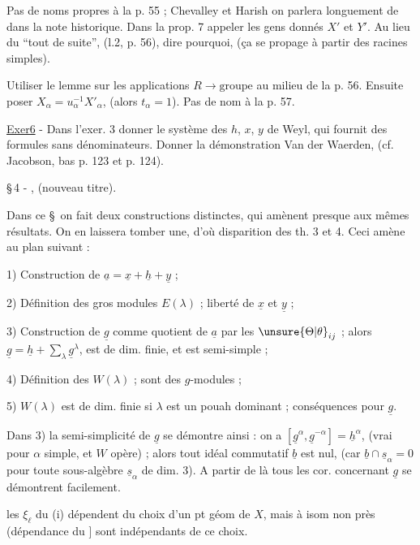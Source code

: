 Pas de noms propres à la p. 55 ; Chevalley et Harish on parlera longuement de dans la note historique. Dans la prop. 7 appeler les gens donnés $X'$ et $Y'$. Au lieu du ``tout de suite'', (l.2, p. 56), dire pourquoi, (ça se propage à partir des racines simples).

Utiliser le lemme sur les applications $R\longrightarrow\text{groupe}$ au milieu de la p. 56. Ensuite poser $X_\alpha=u_\alpha^{-1}X'_\alpha$, (alors $t_\alpha=1$). Pas de nom à la p. 57.

\uline{Exer6} - Dans l'exer. 3 donner le système des $h$, $x$, $y$ de Weyl, qui fournit des formules sans dénominateurs. Donner la démonstration Van der Waerden, (cf. Jacobson, bas p. 123 et p. 124).

\S\,4 - , (nouveau titre).

Dans ce \S\ on fait deux constructions distinctes, qui amènent presque aux mêmes résultats. On en laissera tomber une, d'où disparition des th. 3 et 4. Ceci amène au plan suivant :

1) Construction de $\underline{a}=\underline{x}+\underline{h}+\underline{y}$ ;

2) Définition des gros modules $E(\lambda)$ ; liberté de $\underline{x}$ et $\underline{y}$ ;

3) Construction de $\underline{g}$ comme quotient de $\underline{a}$ par les $\unsure{\Theta|\theta}_{ij}$ ; alors $\underline{g}=\underline{h}+\sum_{\lambda}\underline{g}^{\lambda}$, est de dim. finie, et est semi-simple ;

4) Définition des $W(\lambda)$ ; sont des $g$-modules ;

5) $W(\lambda)$ est de dim. finie si $\lambda$ est un pouah dominant ; conséquences pour $\underline{g}$.

Dans 3) la semi-simplicité de $\underline{g}$ se démontre ainsi : on a $[\underline{g}^{\alpha},\underline{g}^{-\alpha}]=\underline{h}^{\alpha}$, (vrai pour $\alpha$ simple, et $W$ opère) ; alors tout idéal commutatif $\underline{b}$ est nul, (car $\underline{b}\cap\underline{s}_\alpha=0$ pour toute sous-algèbre $\underline{s}_\alpha$ de dim. 3). A partir de là tous les cor. concernant $\underline{g}$ se démontrent facilement.

les $\xi_{\ell}$ du (i) dépendent du choix d'un pt géom de $X$, mais à isom non  près (dépendance du ]  sont indépendants de ce choix.

